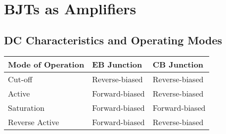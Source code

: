 \documentclass[a4paper,11pt]{article}
\begin{document}
	
	\section{BJTs as Amplifiers}
	\subsection{DC Characteristics and Operating Modes}
	\begin{center}
		\begin{tabular}{|l|l|l|}
			\hline
			Mode of Operation & EB Junction & CB Junction \\ \hline
			Cut-off & Reverse-biased & Reverse-biased \\ \hline
			Active & Forward-biased & Reverse-biased \\ \hline
			Saturation & Forward-biased & Forward-biased \\ \hline
			Reverse Active & Forward-biased & Reverse-biased \\ \hline
		\end{tabular}
	\end{center}
\end{document}

